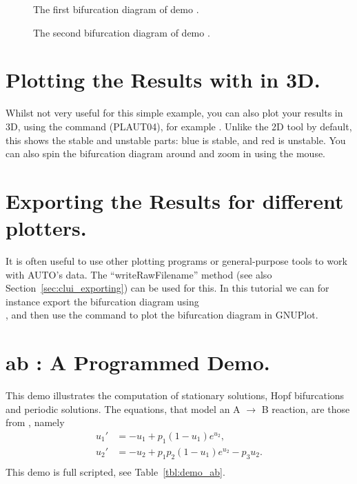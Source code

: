 \documentclass[12pt]{report}
\begin{document}
\begin{figure}[p]
\epsfysize 9.0cm
\centerline{}
\caption{The first bifurcation diagram of demo .}
\label{fig:cusp_1}
\end{figure}
\begin{figure}[p]
\epsfysize 9.0cm
\centerline{}
\caption{The second bifurcation diagram of demo .}
\label{fig:cusp_2}
\end{figure}

\section{ Plotting the Results with \AUTO in 3D.}
Whilst not very useful for this simple example, you can also plot
your results in 3D, using the  command ({\cal PLAUT04}), for example
. Unlike the 2D tool by default, this shows the stable and
unstable parts: blue is stable, and red is unstable. You can also
spin the bifurcation diagram around and zoom in using the mouse.

\section{ Exporting the Results for different plotters.}
It is often useful to use other plotting programs or general-purpose
tools to work with AUTO's data. The ``writeRawFilename'' method (see
also Section~\ref{sec:clui_exporting}) can be used for this.
In this tutorial we can for
instance export the bifurcation diagram using\\
, and then use
the command  to plot
the bifurcation diagram in GNUPlot.

\newpage
\section{ ab : A Programmed Demo.} \label{sec:Demos_ab}
This demo illustrates the computation of 
stationary solutions,
Hopf bifurcations 
and 
periodic solutions.
The equations, that model an A $\to$ B  reaction, are those from
 \citeyear{URP:74}, namely
\begin{equation} \begin{array}{cl}
  u_1 ' &=  -u_1 + p_1 (1-u_1) e^{u_2}, \\
  u_2 ' &=  -u_2 +  p_1 p_2 ( 1-u_1) e^{u_2} - p_3 u_2.\\
\end{array} \end{equation}
This demo is full scripted, see Table~\ref{tbl:demo_ab}.
\end{document}
